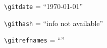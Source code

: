 \documentclass{article}
\providecommand*{\gitdate}{\today}
\providecommand*{\githash}{info not available}
\providecommand*{\gitrefnames}{}
\begin{document}
\verb+\gitdate+ = ``\gitdate''

\verb+\githash+ = ``\githash''

\verb+\gitrefnames+ = ``\gitrefnames''

\thispagestyle{empty}
\end{document}
